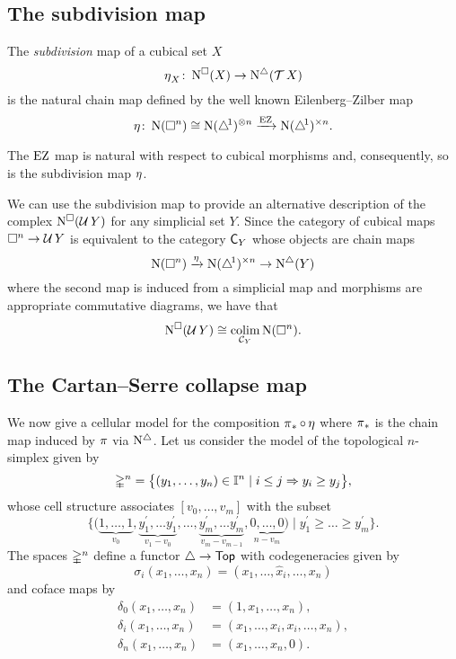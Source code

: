 \subsection{The subdivision map}

The \textit{subdivision} map of a cubical set $X$
\[
\operatorname{\eta}_X \colon \operatorname{N^{\square}}(X) \to \operatorname{N^{\triangle}}(\operatorname{\mathcal{T}} X)
\]
is the natural chain map defined by the well known Eilenberg--Zilber map
\[
\operatorname{\eta} \colon \operatorname{N}(\square^n) \cong \operatorname{N}(\triangle^{\!1})^{\otimes n} \xrightarrow{\operatorname{EZ}} \operatorname{N} (\triangle^{\!1})^{\times n}.
\]

The $\operatorname{EZ}$ map is natural with respect to cubical morphisms and, consequently, so is the subdivision map $\operatorname{\eta}$.

We can use the subdivision map to provide an alternative description of the complex $\operatorname{N^{\square}}(\operatorname{\mathcal{U}} Y)$ for any simplicial set $Y$.
Since the category of cubical maps $\square^n \to \operatorname{\mathcal{U}} Y$ is equivalent to the category $\mathsf{C}_Y$ whose objects are chain maps
\[
\operatorname{N}(\square^n) \xrightarrow{\operatorname{\eta}} \operatorname{N} (\triangle^{\!1})^{\times n} \to \operatorname{N^{\triangle}}(Y)
\]
where the second map is induced from a simplicial map
and morphisms are appropriate commutative diagrams, we have that
\begin{equation} \label{e:alternative description of NUY}
\operatorname{N^{\square}}(\operatorname{\mathcal{U}} Y) \cong \operatorname*{colim}_{\mathcal{C}_Y} \operatorname{N}(\square^n).
\end{equation}

\subsection{The Cartan--Serre collapse map}

We now give a cellular model for the composition $\operatorname{\pi}_\ast \circ \operatorname{\eta}$ where $\operatorname{\pi}_\ast$ is the chain map induced by $\operatorname{\pi}$ via $\operatorname{N^{\triangle}}$.
Let us consider the model of the topological $n$-simplex given by
\[
\mathbb{\Delta}^n = \big\{ (y_1, \dots, y_n) \in \mathbb{I}^n \mid i \leq j \Rightarrow y_i \geq y_j \big\},
\]
whose cell structure associates $[v_0, \dots, v_m]$ with the subset
\[
\Big\{ \big( \underbrace{1, \dots, 1}_{v_0}, \underbrace{y^\prime_1, \dots y^\prime_1}_{v_1-v_0}, \dots, \underbrace{y^\prime_m, \dots y^\prime_m}_{v_m-v_{m-1}}, \underbrace{0, \dots, 0}_{n-v_m} \big) \mid y^\prime_1 \geq \dots \geq y^\prime_m \Big\}.
\]
The spaces $\mathbb{\Delta}^n$ define a functor $\triangle \to \mathsf{Top}$ with codegeneracies given by
\[
\sigma_i(x_1, \dots, x_n) = (x_1, \dots, \widehat x_i, \dots, x_n)
\]
and coface maps by
\begin{align*}
\delta_0(x_1, \dots, x_n) &= (1, x_1, \dots, x_n), \\
\delta_i(x_1, \dots, x_n) &= (x_1, \dots, x_i, x_i, \dots, x_n), \\
\delta_n(x_1, \dots, x_n) &= (x_1, \dots, x_n, 0).
\end{align*}

